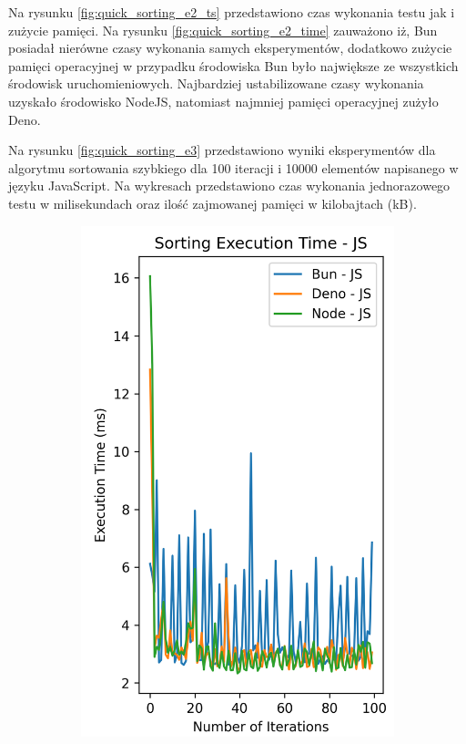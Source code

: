 Na rysunku \ref{fig:quick_sorting_e2_ts} przedstawiono czas wykonania testu jak i zużycie pamięci. Na rysunku \ref{fig:quick_sorting_e2_time} zauważono iż, Bun posiadał nierówne czasy wykonania samych eksperymentów, dodatkowo zużycie pamięci operacyjnej w przypadku środowiska Bun było największe ze wszystkich środowisk uruchomieniowych. Najbardziej ustabilizowane czasy wykonania uzyskało środowisko NodeJS, natomiast najmniej pamięci operacyjnej zużyło Deno.

Na rysunku \ref{fig:quick_sorting_e3} przedstawiono wyniki eksperymentów dla algorytmu sortowania szybkiego dla 100 iteracji i 10000 elementów napisanego w języku JavaScript. Na wykresach przedstawiono czas wykonania jednorazowego testu w milisekundach oraz ilość zajmowanej pamięci w kilobajtach (kB).

\begin{figure}[H]
  \centering
  \begin{subfigure}[b]{0.42\textwidth}
    \centering
    \includegraphics[width=\textwidth]{Figures/sorting/sorting_quick_100_10000_js_time.png}

\end{subfigure}
\end{figure}
